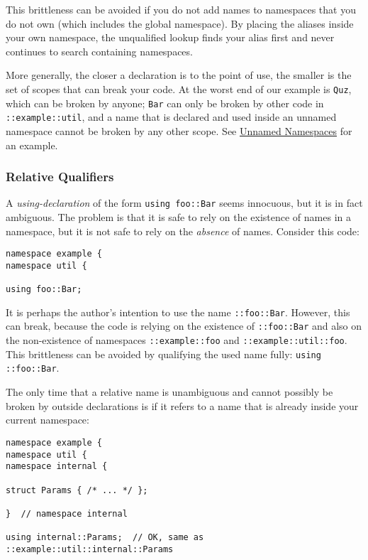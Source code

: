 This brittleness can be avoided if you do not add names to namespaces that you do not own (which includes the global namespace). By placing the aliases inside your own namespace, the unqualified lookup finds your alias first and never continues to search containing namespaces.

More generally, the closer a declaration is to the point of use, the smaller is the set of scopes that can break your code. At the worst end of our example is \texttt{Quz}, which can be broken by anyone; \texttt{Bar} can only be broken by other code in \texttt{::example::util}, and a name that is declared and used inside an unnamed namespace cannot be broken by any other scope. See \hyperref[sec:unnamed-namespaces]{Unnamed Namespaces} for an example.

\subsubsection{Relative Qualifiers}
A \emph{using-declaration} of the form \texttt{using foo::Bar} seems innocuous, but it is in fact ambiguous. The problem is that it is safe to rely on the existence of names in a namespace, but it is not safe to rely on the \emph{absence} of names. Consider this code:
\begin{verbatim}
namespace example {
namespace util {

using foo::Bar;
\end{verbatim}

It is perhaps the author’s intention to use the name \texttt{::foo::Bar}. However, this can break, because the code is relying on the existence of \texttt{::foo::Bar} and also on the non-existence of namespaces \texttt{::example::foo} and \texttt{::example::util::foo}. This brittleness can be avoided by qualifying the used name fully: \texttt{using ::foo::Bar}.

The only time that a relative name is unambiguous and cannot possibly be broken by outside declarations is if it refers to a name that is already inside your current namespace:
\begin{verbatim}
namespace example {
namespace util {
namespace internal {

struct Params { /* ... */ };

}  // namespace internal

using internal::Params;  // OK, same as ::example::util::internal::Params
\end{verbatim}

